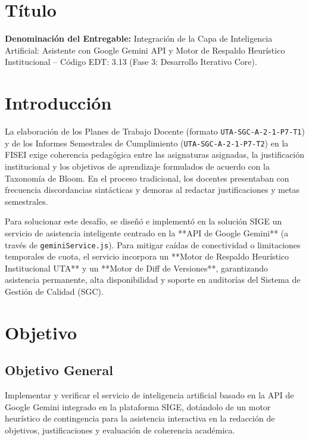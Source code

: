 \documentclass[12pt,a4paper]{article}
\begin{document}

\vspace{0.25cm}

\section{Título}
\textbf{Denominación del Entregable:} Integración de la Capa de Inteligencia Artificial: Asistente con Google Gemini API y Motor de Respaldo Heurístico Institucional -- Código EDT: 3.13 (Fase 3: Desarrollo Iterativo Core).

\section{Introducción}
La elaboración de los Planes de Trabajo Docente (formato \texttt{UTA-SGC-A-2-1-P7-T1}) y de los Informes Semestrales de Cumplimiento (\texttt{UTA-SGC-A-2-1-P7-T2}) en la FISEI exige coherencia pedagógica entre las asignaturas asignadas, la justificación institucional y los objetivos de aprendizaje formulados de acuerdo con la Taxonomía de Bloom. En el proceso tradicional, los docentes presentaban con frecuencia discordancias sintácticas y demoras al redactar justificaciones y metas semestrales.

Para solucionar este desafío, se diseñó e implementó en la solución SIGE un servicio de asistencia inteligente centrado en la **API de Google Gemini** (a través de \texttt{geminiService.js}). Para mitigar caídas de conectividad o limitaciones temporales de cuota, el servicio incorpora un **Motor de Respaldo Heurístico Institucional UTA** y un **Motor de Diff de Versiones**, garantizando asistencia permanente, alta disponibilidad y soporte en auditorías del Sistema de Gestión de Calidad (SGC).

\section{Objetivo}

\subsection{Objetivo General}
Implementar y verificar el servicio de inteligencia artificial basado en la API de Google Gemini integrado en la plataforma SIGE, dotándolo de un motor heurístico de contingencia para la asistencia interactiva en la redacción de objetivos, justificaciones y evaluación de coherencia académica.
\end{document}
